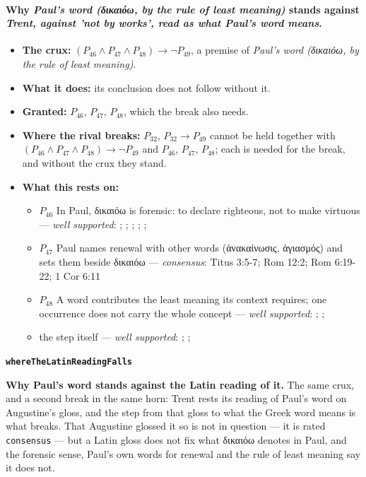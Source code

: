 \documentclass[11pt]{article}
\begin{document}
\paragraph{Why \emph{Paul's word (δικαιόω, by the rule of least meaning)} stands against \emph{Trent, against 'not by works', read as what Paul's word means}.}
\begin{itemize}
\item \textbf{The crux:} \((P_{46} \land P_{47} \land P_{48}) \rightarrow \lnot P_{49}\), a premise of \emph{Paul's word (δικαιόω, by the rule of least meaning)}.
\item \textbf{What it does:} its conclusion does not follow without it.
\item \textbf{Granted:} \(P_{46}\), \(P_{47}\), \(P_{48}\), which the break also needs.
\item \textbf{Where the rival breaks:} \(P_{32}\), \(P_{32} \rightarrow P_{49}\) cannot be held together with \((P_{46} \land P_{47} \land P_{48}) \rightarrow \lnot P_{49}\) and \(P_{46}\), \(P_{47}\), \(P_{48}\); each is needed for the break, and without the crux they stand.
\item \textbf{What this rests on:}
\begin{itemize}
\item \(P_{46}\) In Paul, δικαιόω is forensic: to declare righteous, not to make virtuous --- \emph{well supported}: \cite[s.v. δικαιόω]{bauer-danker-lexicon-2000}; \cite{morris-apostolic-preaching-1965}; \cite[p. 80]{moo-romans-1996}; \cite{irons-righteousness-of-god-2015}; \cite{wright-justification-2009}; \cite[ad loc. Rom 3:24]{fitzmyer-romans-1993}
\item \(P_{47}\) Paul names renewal with other words (ἀνακαίνωσις, ἁγιασμός) and sets them beside δικαιόω --- \emph{consensus}: Titus 3:5-7; Rom 12:2; Rom 6:19-22; 1 Cor 6:11
\item \(P_{48}\) A word contributes the least meaning its context requires; one occurrence does not carry the whole concept --- \emph{well supported}: \cite{silva-biblical-words-1994}; \cite{joos-semantic-axiom-1972}; \cite{barr-semantics-2004}
\item the step itself --- \emph{well supported}: \cite{silva-biblical-words-1994}; \cite[p. 80]{moo-romans-1996}; \cite{barr-semantics-2004}
\end{itemize}
\end{itemize}
\par\medskip\noindent\textbf{\texttt{where\allowbreak{}The\allowbreak{}Latin\allowbreak{}Reading\allowbreak{}Falls}}\par\nobreak\noindent
\textbf{Why Paul's word stands against the Latin reading of it.} The same crux, and a second break in the same horn: Trent rests its reading of Paul's word on Augustine's gloss, and the step from that gloss to what the Greek word means is what breaks. That Augustine glossed it so is not in question — it is rated \texttt{consensus} — but a Latin gloss does not fix what δικαιόω denotes in Paul, and the forensic sense, Paul's own words for renewal and the rule of least meaning say it does not.
\end{document}
